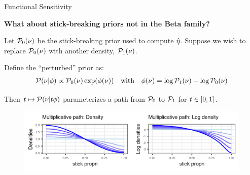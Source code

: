 \begin{frame}{Functional Sensitivity  \citep{gustafson:1996:local}}

\vspace{1em}

\begin{mdframed}[style=MyFrame]
\begin{center}
{\bf What about stick-breaking priors not in the Beta family?}
\end{center}
\end{mdframed}
\pause
Let $\mathcal{P}_0(\nu)$ be the stick-breaking prior used to compute $\hat\eta$.
Suppose we wish to replace $\mathcal{P}_0(\nu)$ with another density, $\mathcal{P}_1(\nu)$. 

\pause
Define the ``perturbed'' prior as:
\begin{align*}
\mathcal{P}(\nu \vert \phi) \propto
\mathcal{P}_{0}(\nu)\exp(\phi(\nu))
\quad\textrm{with}\quad
\phi(\nu) = \log \mathcal{P}_1(\nu) - \log \mathcal{P}_0(\nu)
\end{align*}

\pause 

Then $t \mapsto \mathcal{P}(\nu \vert t \phi)$ 
parameterizes a path from $\mathcal{P}_{0}$ to $\mathcal{P}_{1}$ for $t \in [0,1]$.

\pause

\begin{figure}[!h]
\centering
\includegraphics[width = 1.0\textwidth]{./figure/mult_path-1.png}
\setlength{\textfloatsep}{-10pt}
\end{figure}

\end{frame}





